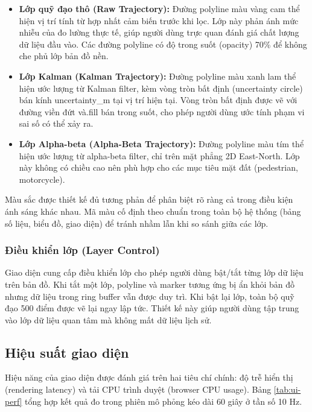 \begin{itemize}
    \item \textbf{Lớp quỹ đạo thô (Raw Trajectory):} Đường polyline màu vàng cam thể hiện vị trí tính từ hợp nhất cảm biến trước khi lọc. Lớp này phản ánh mức nhiễu của đo lường thực tế, giúp người dùng trực quan đánh giá chất lượng dữ liệu đầu vào. Các đường polyline có độ trong suốt (opacity) 70\% để không che phủ lớp bản đồ nền.

    \item \textbf{Lớp Kalman (Kalman Trajectory):} Đường polyline màu xanh lam thể hiện ước lượng từ Kalman filter, kèm vòng tròn bất định (uncertainty circle) bán kính uncertainty\_m tại vị trí hiện tại. Vòng tròn bất định được vẽ với đường viền đứt và.fill bán trong suốt, cho phép người dùng ước tính phạm vi sai số có thể xảy ra.

    \item \textbf{Lớp Alpha-beta (Alpha-Beta Trajectory):} Đường polyline màu tím thể hiện ước lượng từ alpha-beta filter, chỉ trên mặt phẳng 2D East-North. Lớp này không có chiều cao nên phù hợp cho các mục tiêu mặt đất (pedestrian, motorcycle).
\end{itemize}

Màu sắc được thiết kế đủ tương phản để phân biệt rõ ràng cả trong điều kiện ánh sáng khác nhau. Mã màu cố định theo chuẩn trong toàn bộ hệ thống (bảng số liệu, biểu đồ, giao diện) để tránh nhầm lẫn khi so sánh giữa các lớp.

\subsubsection{Điều khiển lớp (Layer Control)}

\hspace{0.5cm} Giao diện cung cấp điều khiển lớp cho phép người dùng bật/tắt từng lớp dữ liệu trên bản đồ. Khi tắt một lớp, polyline và marker tương ứng bị ẩn khỏi bản đồ nhưng dữ liệu trong ring buffer vẫn được duy trì. Khi bật lại lớp, toàn bộ quỹ đạo 500 điểm được vẽ lại ngay lập tức. Thiết kế này giúp người dùng tập trung vào lớp dữ liệu quan tâm mà không mất dữ liệu lịch sử.

\subsection{Hiệu suất giao diện}

\hspace{0.5cm} Hiệu năng của giao diện được đánh giá trên hai tiêu chí chính: độ trễ hiển thị (rendering latency) và tải CPU trình duyệt (browser CPU usage). Bảng \ref{tab:ui-perf} tổng hợp kết quả đo trong phiên mô phỏng kéo dài 60 giây ở tần số 10 Hz.

